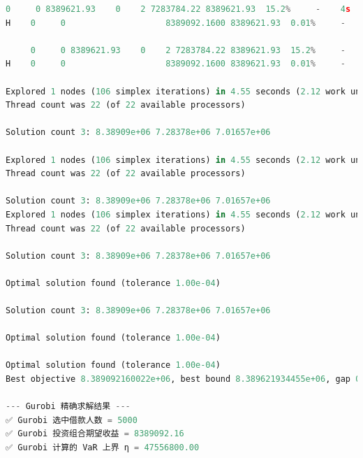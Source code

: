 \documentclass{write_paper}
\begin{document}
\begin{lstlisting}[language=python]
     0     0 8389621.93    0    2 7283784.22 8389621.93  15.2%     -    4s
H    0     0                    8389092.1600 8389621.93  0.01%     -    4s

     0     0 8389621.93    0    2 7283784.22 8389621.93  15.2%     -    4s
H    0     0                    8389092.1600 8389621.93  0.01%     -    4s

Explored 1 nodes (106 simplex iterations) in 4.55 seconds (2.12 work units)
Thread count was 22 (of 22 available processors)

Solution count 3: 8.38909e+06 7.28378e+06 7.01657e+06

Explored 1 nodes (106 simplex iterations) in 4.55 seconds (2.12 work units)
Thread count was 22 (of 22 available processors)

Solution count 3: 8.38909e+06 7.28378e+06 7.01657e+06
Explored 1 nodes (106 simplex iterations) in 4.55 seconds (2.12 work units)
Thread count was 22 (of 22 available processors)

Solution count 3: 8.38909e+06 7.28378e+06 7.01657e+06

Optimal solution found (tolerance 1.00e-04)

Solution count 3: 8.38909e+06 7.28378e+06 7.01657e+06

Optimal solution found (tolerance 1.00e-04)

Optimal solution found (tolerance 1.00e-04)
Best objective 8.389092160022e+06, best bound 8.389621934455e+06, gap 0.0063%

--- Gurobi 精确求解结果 ---
✅ Gurobi 选中借款人数 = 5000
✅ Gurobi 投资组合期望收益 = 8389092.16
✅ Gurobi 计算的 VaR 上界 η = 47556800.00
\end{lstlisting}
\end{document}
